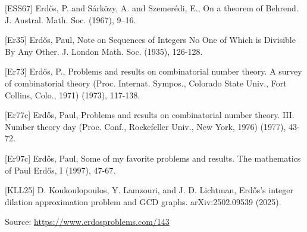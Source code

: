 \documentclass{article}
\begin{document}
 [ESS67] Erd\H{o}s, P. and S\'{a}rk\"ozy, A. and Szemer\'{e}di, E., On a theorem of Behrend. J. Austral. Math. Soc. (1967), 9--16.
 
 [Er35] Erd\H{o}s, Paul, Note on Sequences of Integers No One of Which is Divisible By Any Other. J. London Math. Soc. (1935), 126-128.
 
 [Er73] Erd\H{o}s, P., Problems and results on combinatorial number theory. A survey of combinatorial theory (Proc. Internat. Sympos., Colorado State Univ., Fort Collins, Colo., 1971) (1973), 117-138.
 
 [Er77c] Erd\H{o}s, Paul, Problems and results on combinatorial number theory. III. Number theory day (Proc. Conf., Rockefeller Univ.,
New York, 1976) (1977), 43-72.
 
 [Er97c] Erd\H{o}s, Paul, Some of my favorite problems and results. The mathematics of Paul Erd\H{o}s, I (1997), 47-67.
 
 [KLL25] D. Koukoulopoulos, Y. Lamzouri, and J. D. Lichtman, Erd\H{o}s's integer dilation approximation problem and GCD graphs. arXiv:2502.09539 (2025).

\bigskip
\noindent\small{Source: \url{https://www.erdosproblems.com/143}}
\end{document}
